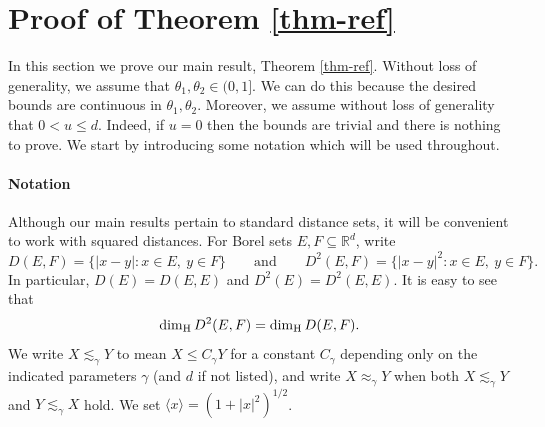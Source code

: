 \documentclass[11pt]{amsart}
\numberwithin{equation}{section}
\renewcommand{\le}{\leqslant}
\renewcommand{\leq}{\leqslant}
\newcommand{\hd}{\dim_{\textup{H}}}
\theoremstyle{plain}
\theoremstyle{remark}
\newcommand{\Rd}{\mathbb{R}^d}
\newcommand{\ang}[1]{\langle #1\rangle}
\begin{document}
\section{Proof of Theorem \ref{thm-ref}} \label{sec:proof}

In this section we prove our main result, Theorem \ref{thm-ref}.  Without loss of generality, we assume that $\theta_1, \theta_2 \in (0,1]$.  We can do this because the desired bounds are continuous in $\theta_1, \theta_2$. Moreover, we assume without loss of generality that  $0<u \leq d$.  Indeed, if $u=0$ then the bounds are trivial and there is nothing to prove.    We start by introducing some notation which will be used throughout. 
\\
\paragraph{\bf Notation}

Although our main results pertain to standard distance sets, it will be convenient to work with squared distances.
For Borel sets $E,F\subseteq\Rd$, write
\[
D(E,F)=\{|x-y|:x\in E,\ y\in F\}
\qquad\text{and}\qquad
D^2(E,F)=\{|x-y|^2:x\in E,\ y\in F\}.
\]
In particular, $D(E)=D(E,E)$ and $D^2(E)=D^2(E,E)$. It is easy to see that
\[
\hd D^2(E,F)=\hd D(E,F).
\]
We write $X\lesssim_{\gamma}Y$ to mean $X\le C_{\gamma}Y$ for a constant $C_{\gamma}$
depending only on the indicated parameters $\gamma$ (and $d$ if not listed), and write $X\approx_{\gamma} Y$
when both $X\lesssim_{\gamma}Y$ and $Y\lesssim_{\gamma}X$ hold.  We set $\ang{x}=(1+|x|^2)^{1/2}$.
\end{document}
